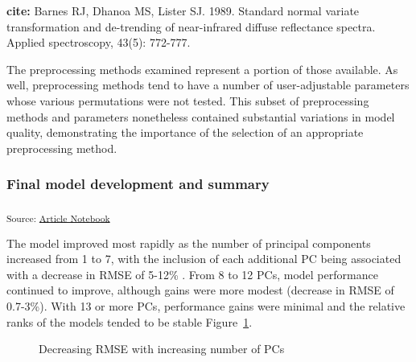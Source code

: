 \documentclass[
]{agujournal2019}
\begin{document}
\textbf{cite:} Barnes RJ, Dhanoa MS, Lister SJ. 1989. Standard normal
variate transformation and de-trending of near-infrared diffuse
reflectance spectra. Applied spectroscopy, 43(5): 772-777.

The preprocessing methods examined represent a portion of those
available. As well, preprocessing methods tend to have a number of
user-adjustable parameters whose various permutations were not tested.
This subset of preprocessing methods and parameters nonetheless
contained substantial variations in model quality, demonstrating the
importance of the selection of an appropriate preprocessing method.

\subsubsection{Final model development and
summary}\label{final-model-development-and-summary}

\textsubscript{Source:
\href{https://rvcrawford.github.io/glowing-system/index-preview.html}{Article
Notebook}}

The model improved most rapidly as the number of principal components
increased from 1 to 7, with the inclusion of each additional PC being
associated with a decrease in RMSE of 5-12\% . From 8 to 12 PCs, model
performance continued to improve, although gains were more modest
(decrease in RMSE of 0.7-3\%). With 13 or more PCs, performance gains
were minimal and the relative ranks of the models tended to be stable
Figure~\ref{fig-model-calibration}.

\label{cell-fig-model-calibration}
\begin{figure}[H]


\caption{\label{fig-model-calibration}Decreasing RMSE with increasing
number of PCs}

\end{figure}%
\end{document}
